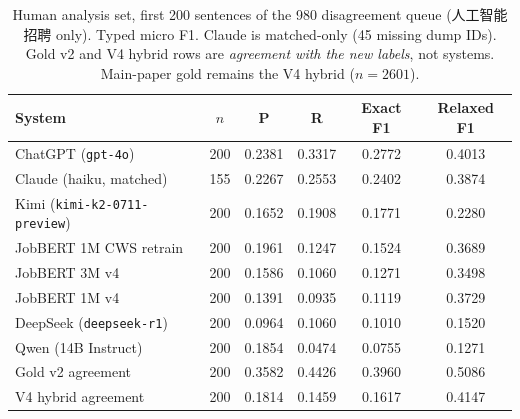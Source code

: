 \begin{table}[t]
\centering
\small
\caption{Human analysis set, first 200 sentences of the 980 disagreement queue (人工智能招聘 only). Typed micro F1. Claude is matched-only (45 missing dump IDs). Gold v2 and V4 hybrid rows are \emph{agreement with the new labels}, not systems. Main-paper gold remains the V4 hybrid ($n{=}2601$).}
\label{tab:human200-page1}
\begin{tabular}{lccccc}
\toprule
System & $n$ & P & R & Exact F1 & Relaxed F1 \\
\midrule
ChatGPT (\texttt{gpt-4o}) & 200 & 0.2381 & 0.3317 & 0.2772 & 0.4013 \\
Claude (haiku, matched) & 155 & 0.2267 & 0.2553 & 0.2402 & 0.3874 \\
Kimi (\texttt{kimi-k2-0711-preview}) & 200 & 0.1652 & 0.1908 & 0.1771 & 0.2280 \\
JobBERT 1M CWS retrain & 200 & 0.1961 & 0.1247 & 0.1524 & 0.3689 \\
JobBERT 3M v4 & 200 & 0.1586 & 0.1060 & 0.1271 & 0.3498 \\
JobBERT 1M v4 & 200 & 0.1391 & 0.0935 & 0.1119 & 0.3729 \\
DeepSeek (\texttt{deepseek-r1}) & 200 & 0.0964 & 0.1060 & 0.1010 & 0.1520 \\
Qwen (14B Instruct) & 200 & 0.1854 & 0.0474 & 0.0755 & 0.1271 \\
\midrule
Gold v2 agreement & 200 & 0.3582 & 0.4426 & 0.3960 & 0.5086 \\
V4 hybrid agreement & 200 & 0.1814 & 0.1459 & 0.1617 & 0.4147 \\
\bottomrule
\end{tabular}
\end{table}

